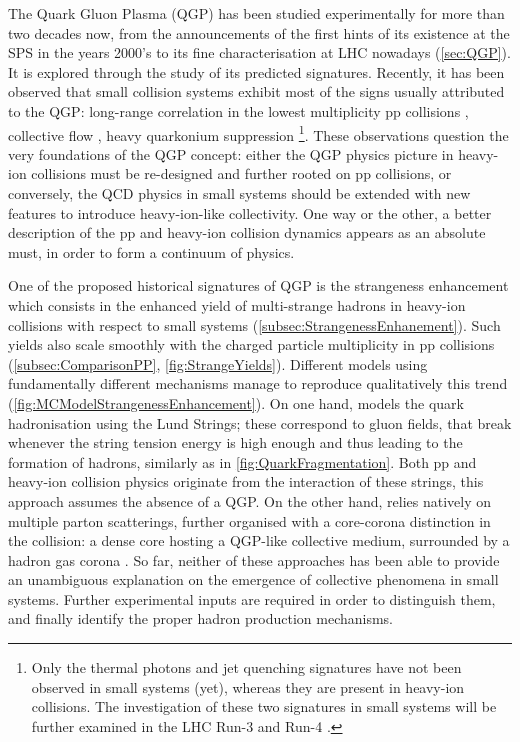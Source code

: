 The Quark Gluon Plasma (QGP) has been studied experimentally for more than two decades now, from the announcements of the first hints of its existence at the SPS in the years 2000's to its fine characterisation at LHC nowadays (\Sec\ref{sec:QGP}). It is explored through the study of its predicted signatures. Recently, it has been observed that small collision systems exhibit most of the signs usually attributed to the QGP: long-range correlation in the lowest multiplicity pp collisions \cite{alicecollaborationALICESeesRidge}, collective flow \cite{cmscollaborationEvidenceCollectiveMultiparticle2015, alicecollaborationAnisotropicFlowFlow2023}, heavy quarkonium suppression \cite{singhCharmoniumSuppressionUltrarelativistic2022}\footnote{Only the thermal photons and jet quenching signatures have not been observed in small systems (yet), whereas they are present in heavy-ion collisions. The investigation of these two signatures in small systems will be further examined in the LHC Run-3 and Run-4 \cite{vanleeuwenHighlightsALICE59th2023}.}. These observations question the very foundations of the QGP concept: either the QGP physics picture in heavy-ion collisions must be re-designed and further rooted on pp collisions, or conversely, the QCD physics in small systems should be extended with new features to introduce heavy-ion-like collectivity. One way or the other, a better description of the pp and heavy-ion collision dynamics appears as an absolute must, in order to form a continuum of physics.

One of the proposed historical signatures of QGP is the strangeness enhancement which consists in the enhanced yield of multi-strange hadrons in heavy-ion collisions with respect to small systems (\Sec\ref{subsec:StrangenessEnhanement}). Such yields also scale smoothly with the charged particle multiplicity in pp collisions (\Sec\ref{subsec:ComparisonPP}, \fig\ref{fig:StrangeYields}). Different models using fundamentally different mechanisms manage to reproduce qualitatively this trend (\fig\ref{fig:MCModelStrangenessEnhancement}). On one hand, \Pythia \cite{bierlichComprehensiveGuidePhysics2022, skandsTuningPYTHIAMonash2014} models the quark hadronisation using the Lund Strings; these correspond to gluon fields, that break whenever the string tension energy is high enough and thus leading to the formation of hadrons, similarly as in \fig\ref{fig:QuarkFragmentation}. Both pp and heavy-ion collision physics originate from the interaction of these strings, \ie this approach assumes the absence of a QGP. On the other hand, \Epos \cite{wernerCorecoronaProcedureMicrocanonical2023} relies natively on multiple parton scatterings, further organised with a core-corona distinction in the collision: a dense core hosting a QGP-like collective medium, surrounded by a hadron gas corona \cite{wernerAnalysingRadialFlow2014}. So far, neither of these approaches has been able to provide an unambiguous explanation on the emergence of collective phenomena in small systems. Further experimental inputs are required in order to distinguish them, and finally identify the proper hadron production mechanisms. \\

